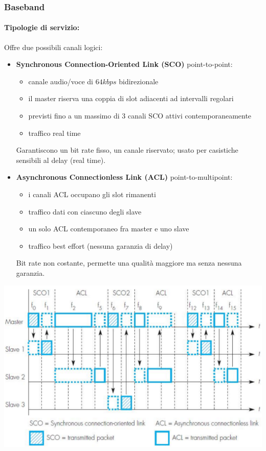 \subsubsection{Baseband}

\paragraph{Tipologie di servizio:} Offre due possibili canali logici: 
\begin{itemize}
	\item \textbf{Synchronous Connection-Oriented Link (SCO)} point-to-point:
	\begin{itemize}
		\item canale audio/voce di $64kbps$ bidirezionale

		\item il master riserva una coppia di slot adiacenti ad intervalli regolari

		\item previsti fino a un massimo di 3 canali SCO attivi contemporaneamente

		\item traffico real time
	\end{itemize}
	Garantiscono un bit rate fisso, un canale riservato; usato per casistiche sensibili al delay (real time).
	
	\item \textbf{Asynchronous Connectionless Link (ACL)} point-to-multipoint:
	\begin{itemize}
		\item i canali ACL occupano gli slot rimanenti

		\item traffico dati con ciascuno degli slave

		\item un solo ACL contemporaneo fra master e uno slave

		\item traffico best effort (nessuna garanzia di delay)
	\end{itemize}
	Bit rate non costante, permette una qualità maggiore ma senza nessuna garanzia.
\end{itemize}
\begin{center}
	\includegraphics[width=0.9\linewidth]{img/wpan/scoacl}
\end{center}

